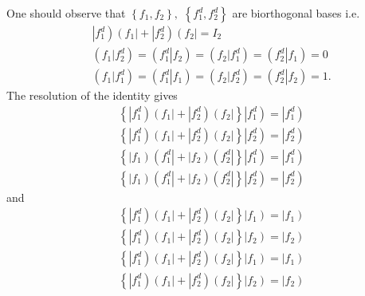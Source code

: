 \documentclass[aps,preprint]{revtex4}
\begin{document}
One should observe that $\left\{ f_{1},f_{2}\right\} ,$ $\left\{
f_{1}^{d},f_{2}^{d}\right\} $ are biorthogonal bases i.e. 
\begin{align}
& \left\vert f_{1}^{d}\right) \left( f_{1}\right\vert +\left\vert
f_{2}^{d}\right) \left( f_{2}\right\vert =I_{2} \\
& \left( \left. f_{1}\right\vert f_{2}^{d}\right) =\left( \left.
f_{1}^{d}\right\vert f_{2}\right) =\left( \left. f_{2}\right\vert
f_{1}^{d}\right) =\left( \left. f_{2}^{d}\right\vert f_{1}\right) =0 \\
& \left( \left. f_{1}\right\vert f_{1}^{d}\right) =\left( \left.
f_{1}^{d}\right\vert f_{1}\right) =\left( \left. f_{2}\right\vert
f_{2}^{d}\right) =\left( \left. f_{2}^{d}\right\vert f_{2}\right) =1.
\end{align}%
The resolution of the identity gives 
\begin{align}
& \left\{ \left\vert f_{1}^{d}\right) \left( f_{1}\right\vert +\left\vert
f_{2}^{d}\right) \left( f_{2}\right\vert \right\} \left\vert
f_{1}^{d}\right) =\left\vert f_{1}^{d}\right) \\
& \left\{ \left\vert f_{1}^{d}\right) \left( f_{1}\right\vert +\left\vert
f_{2}^{d}\right) \left( f_{2}\right\vert \right\} \left\vert
f_{2}^{d}\right) =\left\vert f_{2}^{d}\right)
\end{align}%
\begin{align}
& \left\{ \left\vert f_{1}\right) \left( f_{1}^{d}\right\vert +\left\vert
f_{2}\right) \left( f_{2}^{d}\right\vert \right\} \left\vert
f_{1}^{d}\right) =\left\vert f_{1}^{d}\right) \\
& \left\{ \left\vert f_{1}\right) \left( f_{1}^{d}\right\vert +\left\vert
f_{2}\right) \left( f_{2}^{d}\right\vert \right\} \left\vert
f_{2}^{d}\right) =\left\vert f_{2}^{d}\right)
\end{align}%
and 
\begin{align}
& \left\{ \left\vert f_{1}^{d}\right) \left( f_{1}\right\vert +\left\vert
f_{2}^{d}\right) \left( f_{2}\right\vert \right\} \left\vert f_{1}\right)
=\left\vert f_{1}\right) \\
& \left\{ \left\vert f_{1}^{d}\right) \left( f_{1}\right\vert +\left\vert
f_{2}^{d}\right) \left( f_{2}\right\vert \right\} \left\vert f_{2}\right)
=\left\vert f_{2}\right)
\end{align}%
\begin{align}
& \left\{ \left\vert f_{1}^{d}\right) \left( f_{1}\right\vert +\left\vert
f_{2}^{d}\right) \left( f_{2}\right\vert \right\} \left\vert f_{1}\right)
=\left\vert f_{1}\right) \\
& \left\{ \left\vert f_{1}^{d}\right) \left( f_{1}\right\vert +\left\vert
f_{2}^{d}\right) \left( f_{2}\right\vert \right\} \left\vert f_{2}\right)
=\left\vert f_{2}\right)
\end{align}
\end{document}
